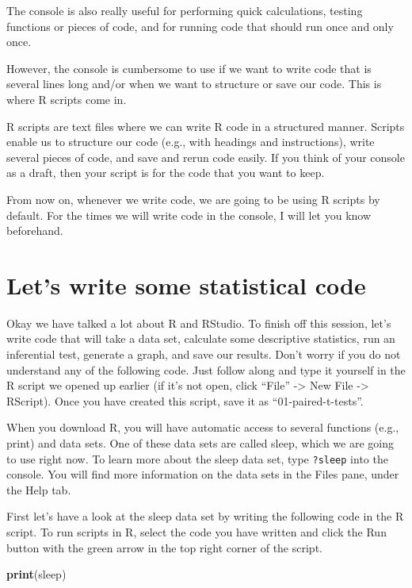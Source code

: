 \documentclass[
]{book}
\newenvironment{Shaded}{\begin{snugshade}}{\end{snugshade}}
\newcommand{\FunctionTok}[1]{\textcolor[rgb]{0.13,0.29,0.53}{\textbf{#1}}}
\newcommand{\NormalTok}[1]{#1}
\begin{document}
The console is also really useful for performing quick calculations, testing functions or pieces of code, and for running code that should run once and only once.

However, the console is cumbersome to use if we want to write code that is several lines long and/or when we want to structure or save our code. This is where R scripts come in.

R scripts are text files where we can write R code in a structured manner. Scripts enable us to structure our code (e.g., with headings and instructions), write several pieces of code, and save and rerun code easily. If you think of your console as a draft, then your script is for the code that you want to keep.

From now on, whenever we write code, we are going to be using R scripts by default. For the times we will write code in the console, I will let you know beforehand.

\hypertarget{lets-write-some-statistical-code}{%
\section{Let's write some statistical code}\label{lets-write-some-statistical-code}}

Okay we have talked a lot about R and RStudio. To finish off this session, let's write code that will take a data set, calculate some descriptive statistics, run an inferential test, generate a graph, and save our results. Don't worry if you do not understand any of the following code. Just follow along and type it yourself in the R script we opened up earlier (if it's not open, click ``File'' -\textgreater{} New File -\textgreater{} RScript). Once you have created this script, save it as ``01-paired-t-tests''.

When you download R, you will have automatic access to several functions (e.g., print) and data sets. One of these data sets are called sleep, which we are going to use right now. To learn more about the sleep data set, type \texttt{?sleep} into the console. You will find more information on the data sets in the Files pane, under the Help tab.

First let's have a look at the sleep data set by writing the following code in the R script. To run scripts in R, select the code you have written and click the Run button with the green arrow in the top right corner of the script.

\begin{Shaded}
\begin{Highlighting}[]
\FunctionTok{print}\NormalTok{(sleep) }
\end{Highlighting}
\end{Shaded}
\end{document}
